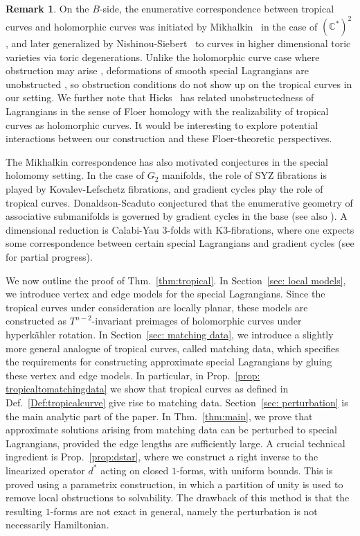\documentclass{article}
\theoremstyle{definition}
\newtheorem{rmk}{Remark}
\newcommand{\C}{\mathbb{C}}
\begin{document}
\begin{rmk}
On the $B$-side, the enumerative correspondence between tropical curves and holomorphic curves was initiated by Mikhalkin~\cite{Mikhalkin06} in the case of $(\C^*)^2$, and 
later generalized by Nishinou-Siebert~\cite{Nishinou-Siebert} to curves in higher dimensional toric varieties via toric degenerations. Unlike the holomorphic curve case where obstruction may arise \cite{Mikhalkin04}\cite{Speyer}, deformations of smooth special Lagrangians are unobstructed \cite{Marshall}\cite{McLean}, so obstruction conditions do not show up on the tropical curves in our setting. We further note that Hicks~\cite{Hicks} has related unobstructedness of Lagrangians in the sense of Floer homology with the realizability of tropical curves as holomorphic curves. It would be interesting to explore potential interactions between our construction and these Floer-theoretic perspectives.


  The Mikhalkin correspondence has also motivated conjectures in the special holomomy setting. In the case of $G_2$ manifolds, the role of SYZ fibrations is played by Kovalev-Lefschetz fibrations, and gradient cycles play the role of tropical curves.  Donaldson-Scaduto \cite{Donaldson-Scaduto} conjectured that the enumerative geometry of associative submanifolds is governed by gradient cycles in the base (see also \cite{Doan-Walpuski}\cite{Esfahani-Li}). A dimensional reduction is Calabi-Yau 3-folds with K3-fibrations, where one expects some correspondence between certain special Lagrangians and gradient cycles (see \cite{Chiu-Lin} for partial progress). 

\end{rmk}
    




    We now outline the proof of Thm.~\ref{thm:tropical}. In Section~\ref{sec: local models}, we introduce vertex and edge models for the special Lagrangians. Since the tropical curves under consideration are locally planar, these models are constructed as $T^{n-2}$-invariant preimages of holomorphic curves under hyperk\"ahler rotation. In Section~\ref{sec: matching data}, we introduce a slightly more general analogue of tropical curves, called matching data, which specifies the requirements for constructing approximate special Lagrangians by gluing these vertex and edge models.  In particular, in Prop.~\ref{prop: tropicaltomatchingdata} we show that tropical curves as defined in Def.~\ref{Def:tropicalcurve} give rise to matching data. Section~\ref{sec: perturbation} is the main analytic part of the paper. In Thm.~\ref{thm:main}, we prove that approximate solutions arising from matching data can be perturbed to special Lagrangians, provided the edge lengths are sufficiently large. A crucial technical ingredient is Prop.~\ref{prop:dstar}, where we construct a right inverse to the linearized operator $d^*$ acting on closed $1$-forms, with uniform bounds. This is proved using a parametrix construction, in which a partition of unity is used to remove local obstructions to solvability. The drawback of this method is that the resulting $1$-forms are not exact in general, namely the perturbation is not necessarily Hamiltonian. \newline
\end{document}
